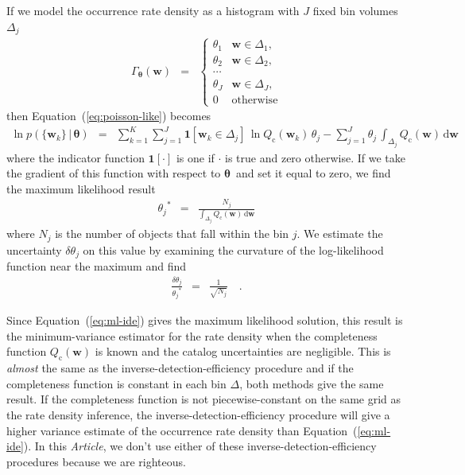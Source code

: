 \documentclass[12pt,preprint]{aastex}
\newcommand{\paper}{\textsl{Article}}
\newcommand{\Eq}[1]{Equation~(\ref{eq:#1})}
\newcommand{\eq}[1]{\Eq{#1}}
\newcommand{\eqlabel}[1]{\label{eq:#1}}
\newcommand{\dd}{\ensuremath{\,\mathrm{d}}}
\newcommand{\bvec}[1]{\ensuremath{\boldsymbol{#1}}}
\newcommand{\rate}{\ensuremath{\Gamma}}
\newcommand{\ratepar}{{\ensuremath{\theta}}}
\newcommand{\ratepars}{{\ensuremath{\bvec{\ratepar}}}}
\newcommand{\completeness}{{\ensuremath{Q_\mathrm{c}}}}
\newcommand{\entry}{{\ensuremath{\bvec{w}}}}
\newcommand{\binarea}{{\ensuremath{\Delta}}}
\begin{document}
If we model the occurrence rate density as a histogram with $J$ fixed bin
volumes $\binarea_j$
\begin{eqnarray}
\rate_\ratepars (\entry) &=& \left\{\begin{array}{ll}
\ratepar_1 & \entry \in \binarea_1,\\
\ratepar_2 & \entry \in \binarea_2,\\
\cdots \\
\ratepar_J & \entry \in \binarea_J,\\
0 & \mathrm{otherwise}
\end{array}\right.
\end{eqnarray}
then \eq{poisson-like} becomes
\begin{eqnarray}
\ln p(\{\entry_k\}\,|\,\ratepars) &=&
    \sum_{k=1}^K \sum_{j=1}^J \mathbf{1}[\entry_k \in
        \binarea_j]\,\ln\completeness(\entry_k)\,\ratepar_j
    -\sum_{j=1}^J\ratepar_j\,\int_{\binarea_j} \completeness(\entry)\dd\entry
\end{eqnarray}
where the indicator function $\mathbf{1}[\cdot]$ is one if $\cdot$ is true and
zero otherwise.
If we take the gradient of this function with respect to \ratepars\ and set it
equal to zero, we find the maximum likelihood result
\begin{eqnarray}\eqlabel{ml-ide}
{\ratepar_j}^* &=&
\frac{N_j}{\int_{\binarea_j} \completeness(\entry)\dd\entry}
\end{eqnarray}
where $N_j$ is the number of objects that fall within the bin $j$.
We estimate the uncertainty $\delta\ratepar_j$ on this value by examining the
curvature of the log-likelihood function near the maximum and find
\begin{eqnarray}
\frac{\delta\ratepar_j}{{\ratepar_j}^*} &=& \frac{1}{\sqrt{N_j}} \quad.
\end{eqnarray}

Since \eq{ml-ide} gives the maximum likelihood solution, this result is the
minimum-variance estimator for the rate density when the completeness function
$\completeness(\entry)$ is known and the catalog uncertainties are negligible.
This is \emph{almost} the same as the inverse-detection-efficiency procedure
and if the completeness function is constant in each bin \binarea, both
methods give the same result.
If the completeness function is not piecewise-constant on the same grid as the
rate density inference, the inverse-detection-efficiency procedure will
give a higher variance estimate of the occurrence rate density than
\eq{ml-ide}.
In this \paper, we don't use either of these inverse-detection-efficiency
procedures because we are righteous.
\end{document}
